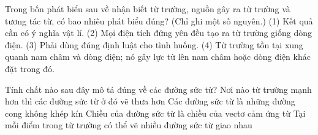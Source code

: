 \begin{ex}
Trong bốn phát biểu sau về nhận biết từ trường, nguồn gây ra từ trường và tương tác từ, có bao nhiêu phát biểu đúng? (Chỉ ghi một số nguyên.) (1) Kết quả cần có ý nghĩa vật lí. (2) Mọi điện tích đứng yên đều tạo ra từ trường giống dòng điện. (3) Phải dùng đúng định luật cho tình huống. (4) Từ trường tồn tại xung quanh nam châm và dòng điện; nó gây lực từ lên nam châm hoặc dòng điện khác đặt trong đó.
\end{ex}

\begin{ex}
Tính chất nào sau đây mô tả đúng về các đường sức từ?
\choice
{Nơi nào từ trường mạnh hơn thì các đường sức từ ở đó vẽ thưa hơn}
{Các đường sức từ là những đường cong không khép kín}
{\True Chiều của đường sức từ là chiều của vectơ cảm ứng từ}
{Tại mỗi điểm trong từ trường có thể vẽ nhiều đường sức từ giao nhau}
\end{ex}

